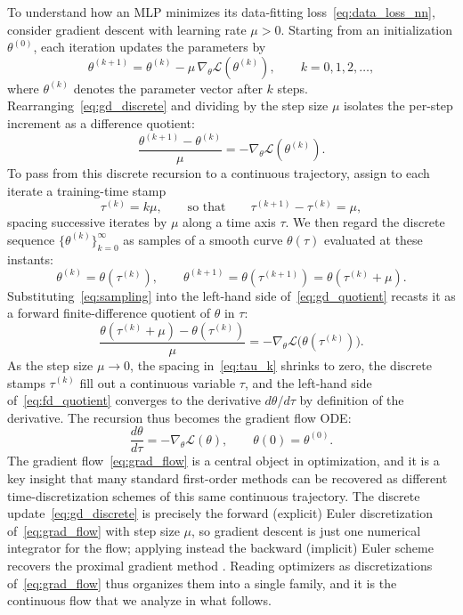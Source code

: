 To understand how an MLP minimizes its data-fitting loss~\eqref{eq:data_loss_nn}, consider gradient descent with learning rate $\mu > 0$. Starting from an initialization $\theta^{(0)}$, each iteration updates the parameters by
\begin{equation}\label{eq:gd_discrete}
    \theta^{(k+1)} = \theta^{(k)} - \mu\,\nabla_\theta\mathcal{L}(\theta^{(k)}), \qquad k = 0, 1, 2, \ldots,
\end{equation}
where $\theta^{(k)}$ denotes the parameter vector after $k$ steps. Rearranging~\eqref{eq:gd_discrete} and dividing by the step size $\mu$ isolates the per-step increment as a difference quotient:
\begin{equation}\label{eq:gd_quotient}
    \frac{\theta^{(k+1)} - \theta^{(k)}}{\mu} = -\nabla_\theta\mathcal{L}(\theta^{(k)}).
\end{equation}
To pass from this discrete recursion to a continuous trajectory, assign to each iterate a training-time stamp
\begin{equation}\label{eq:tau_k}
    \tau^{(k)} = k\mu, \qquad \text{so that} \qquad \tau^{(k+1)} - \tau^{(k)} = \mu,
\end{equation}
spacing successive iterates by $\mu$ along a time axis $\tau$. We then regard the discrete sequence $\{\theta^{(k)}\}_{k=0}^{\infty}$ as samples of a smooth curve $\theta(\tau)$ evaluated at these instants:
\begin{equation}\label{eq:sampling}
    \theta^{(k)} = \theta(\tau^{(k)}), \qquad \theta^{(k+1)} = \theta(\tau^{(k+1)}) = \theta(\tau^{(k)} + \mu).
\end{equation}
Substituting~\eqref{eq:sampling} into the left-hand side of~\eqref{eq:gd_quotient} recasts it as a forward finite-difference quotient of $\theta$ in $\tau$:
\begin{equation}\label{eq:fd_quotient}
    \frac{\theta(\tau^{(k)} + \mu) - \theta(\tau^{(k)})}{\mu} = -\nabla_\theta\mathcal{L}\bigl(\theta(\tau^{(k)})\bigr).
\end{equation}
As the step size $\mu \to 0$, the spacing in~\eqref{eq:tau_k} shrinks to zero, the discrete stamps $\tau^{(k)}$ fill out a continuous variable $\tau$, and the left-hand side of~\eqref{eq:fd_quotient} converges to the derivative $d\theta/d\tau$ by definition of the derivative. The recursion thus becomes the gradient flow ODE:
\begin{equation}\label{eq:grad_flow}
    \frac{d\theta}{d\tau} = -\nabla_\theta \mathcal{L}(\theta), \qquad \theta(0) = \theta^{(0)}.
\end{equation}
The gradient flow~\eqref{eq:grad_flow} is a central object in optimization, and it is a key insight that many standard first-order methods can be recovered as different time-discretization schemes of this same continuous trajectory. The discrete update~\eqref{eq:gd_discrete} is precisely the forward (explicit) Euler discretization of~\eqref{eq:grad_flow} with step size $\mu$, so gradient descent is just one numerical integrator for the flow; applying instead the backward (implicit) Euler scheme recovers the proximal gradient method \parencite{parikh2013}. Reading optimizers as discretizations of~\eqref{eq:grad_flow} thus organizes them into a single family, and it is the continuous flow that we analyze in what follows.


